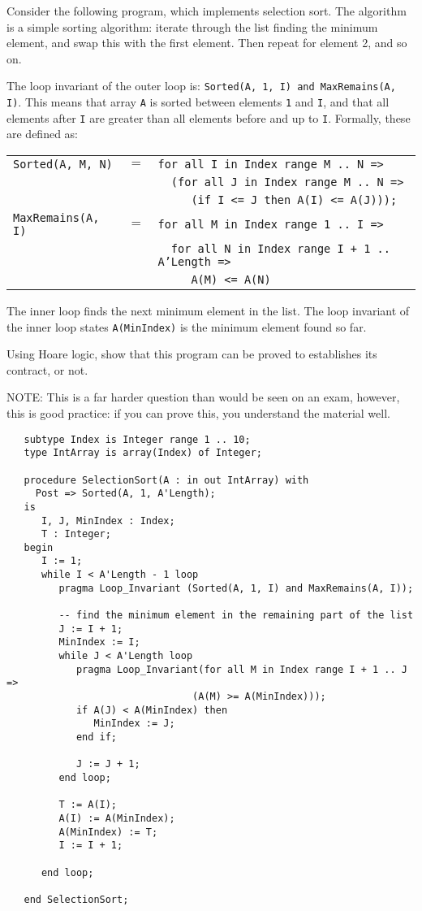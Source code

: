 
Consider the following program, which implements selection sort. The algorithm is a simple sorting algorithm: iterate through the list finding the minimum element, and swap this with the first element. Then repeat for element 2, and so on.


The loop invariant of the outer loop is: {\tt Sorted(A, 1, I) and MaxRemains(A, I)}. This means that array {\tt A} is sorted between elements {\tt 1} and {\tt I}, and that all elements after {\tt I} are greater than all elements before and up to {\tt I}. Formally, these are defined as:

\begin{tabular}{lll}
 {\tt Sorted(A, M, N)} & $=$ & {\tt for all I in Index range M .. N =>}\\
 & & {\tt ~~(for all J in Index range M .. N =>}\\
 & & {\tt ~~~~ (if I <= J then A(I) <= A(J)));}\\[2mm]
{\tt MaxRemains(A, I)} & $=$ & {\tt for all M in Index range 1 .. I =>}\\
 & & {\tt ~~for all N in Index range I + 1 .. A'Length =>}\\
 & & {\tt ~~~~ A(M) <= A(N)}\\
\end{tabular}

The inner loop finds the next minimum element in the list.
The loop invariant of the inner loop states {\tt A(MinIndex)} is the minimum element found so far.

Using Hoare logic, show that this program can be proved to establishes its contract, or not. 

NOTE: This is a far harder question than would be seen on an exam, however, this is good practice: if you can prove this, you understand the material well.

\begin{verbatim}
   subtype Index is Integer range 1 .. 10;
   type IntArray is array(Index) of Integer;

   procedure SelectionSort(A : in out IntArray) with
     Post => Sorted(A, 1, A'Length);
   is
      I, J, MinIndex : Index;
      T : Integer;
   begin
      I := 1;
      while I < A'Length - 1 loop
         pragma Loop_Invariant (Sorted(A, 1, I) and MaxRemains(A, I));

         -- find the minimum element in the remaining part of the list
         J := I + 1;
         MinIndex := I;
         while J < A'Length loop
            pragma Loop_Invariant(for all M in Index range I + 1 .. J =>
                                (A(M) >= A(MinIndex)));
            if A(J) < A(MinIndex) then
               MinIndex := J;
            end if;

            J := J + 1;
         end loop;

         T := A(I);
         A(I) := A(MinIndex);
         A(MinIndex) := T;
         I := I + 1;

      end loop;

   end SelectionSort;
\end{verbatim}  


